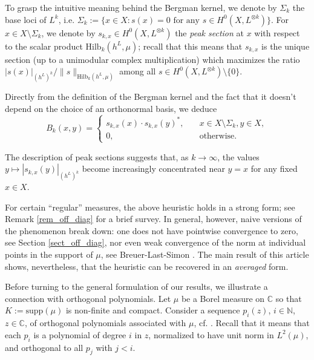 \documentclass[12pt]{article}
\numberwithin{equation}{section}
\theoremstyle{theorem}
\theoremstyle{definition}
\theoremstyle{remark}
\newcommand{\comp}{\mathbb{C}}
\newcommand{\nat}{\mathbb{N}}
\begin{document}
	\par 
	To grasp the intuitive meaning behind the Bergman kernel, we denote by $\Sigma_k$ the base loci of $L^k$, i.e. $\Sigma_k := \{ x \in X  :  s(x) = 0 \text{ for any } s \in H^0(X, L^{\otimes k}) \}$.
	For $x \in X \setminus \Sigma_k$, we denote by $s_{k, x} \in H^0(X, L^{\otimes k})$ the \textit{peak section} at $x$ with respect to the scalar product ${\textrm{Hilb}}_k(h^L, \mu)$; recall that this means that $s_{k, x}$ is the unique section (up to a unimodular complex multiplication) which maximizes the ratio $|s(x)|_{(h^L)^k} / \| s \|_{{\textrm{Hilb}}_k(h^L, \mu)}$ among all $s \in H^0(X, L^{\otimes k}) \setminus \{0\}$.
	\par 
	Directly from the definition of the Bergman kernel and the fact that it doesn't depend on the choice of an orthonormal basis, we deduce 
	\begin{equation}\label{eq_bk_id}
			B_k(x, y) = 
			\begin{cases} s_{k, x}(x) \cdot s_{k, x}(y)^*, \quad & x \in X \setminus \Sigma_k, y \in X,
			\\
			0, &\text{otherwise.}
			\end{cases}
	\end{equation}
	\par 
	The description of peak sections suggests that, as $k \to \infty$, the values $y \mapsto |s_{k, x}(y)|_{(h^L)^k}$ become increasingly concentrated near $y = x$ for any fixed $x \in X$.
	\par 
	For certain “regular” measures, the above heuristic holds in a strong form; see Remark \ref{rem_off_diag} for a brief survey.
	In general, however, naive versions of the phenomenon break down: one does not have pointwise convergence to zero, see Section \ref{sect_off_diag}, nor even weak convergence of the norm at individual points in the support of $\mu$, see Breuer-Last-Simon \cite[\S3-5]{NevaiCond}.
	The main result of this article shows, nevertheless, that the heuristic can be recovered in an \emph{averaged} form.
	\par 
	Before turning to the general formulation of our results, we illustrate a connection with orthogonal polynomials.
	Let $\mu$ be a Borel measure on $\comp$ so that $K := {\textrm{supp}}(\mu)$ is non-finite and compact. 
	Consider a sequence $p_i(z)$, $i \in \nat$, $z \in \comp$, of orthogonal polynomials associated with $\mu$, cf. \cite{SzegoBookOrt}. 
	Recall that it means that each $p_i$ is a polynomial of degree $i$ in $z$, normalized to have unit norm in $L^2(\mu)$, and orthogonal to all $p_j$ with $j < i$.
\end{document}

